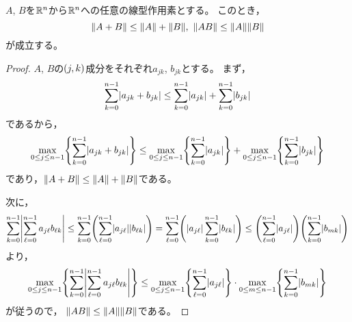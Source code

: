 \documentclass[b5paper,oneside,openany]{ltjsbook} %
\begin{document}
\begin{prop}
    $A$, $B$を$\mathbb{R}^n$から$\mathbb{R}^n$への任意の線型作用素とする。
    このとき，
    \begin{equation}
        \norm{A+B}\leq \norm{A}+\norm{B},\ \norm{AB}\leq \norm{A}\norm{B}
    \end{equation}
    が成立する。
    \begin{proof}
        $A$, $B$の$\pare{j,k}$成分をそれぞれ$a_{jk}$, $b_{jk}$とする。
        まず，
        \begin{equation}
            \sum_{k=0}^{n-1}\abs{a_{jk}+b_{jk}}
            \leq \sum_{k=0}^{n-1}\abs{a_{jk}}
            +\sum_{k=0}^{n-1}\abs{b_{jk}}
        \end{equation}
        であるから，
        \begin{equation}
            \max_{0\leq j\leq n-1}\bra{\sum_{k=0}^{n-1}\abs{a_{jk}+b_{jk}}}
            \leq \max_{0\leq j\leq n-1}\bra{\sum_{k=0}^{n-1}\abs{a_{jk}}}
            +\max_{0\leq j\leq n-1}\bra{\sum_{k=0}^{n-1}\abs{b_{jk}}}
        \end{equation}
        であり，$\norm{A+B}\leq \norm{A}+\norm{B}$である。
        
        次に，
        \begin{equation}
            \sum_{k=0}^{n-1}\abs{\sum_{\ell=0}^{n-1}a_{j\ell}b_{\ell k}}
            \leq \sum_{k=0}^{n-1}\pare{\sum_{\ell=0}^{n-1}\abs{a_{j\ell}}\abs{b_{\ell k}}}
            =\sum_{\ell=0}^{n-1}\pare{\abs{a_{j\ell}}\sum_{k=0}^{n-1}\abs{b_{\ell k}}}
            \leq \pare{\sum_{\ell=0}^{n-1}\abs{a_{j\ell}}}
            \pare{\sum_{k=0}^{n-1}\abs{b_{mk}}}
        \end{equation}
        より，
        \begin{equation}
            \max_{0\leq j\leq n-1}\bra{\sum_{k=0}^{n-1}\abs{\sum_{\ell=0}^{n-1}a_{j\ell}b_{\ell k}}}
            \leq \max_{0\leq j\leq n-1}\bra{\sum_{\ell=0}^{n-1}\abs{a_{j\ell}}}\cdot \max_{0\leq m\leq n-1}\bra{\sum_{k=0}^{n-1}\abs{b_{mk}}}
        \end{equation}
        が従うので，
        $\norm{AB}\leq \norm{A}\norm{B}$である。
    \end{proof}
\end{prop}
\end{document}
